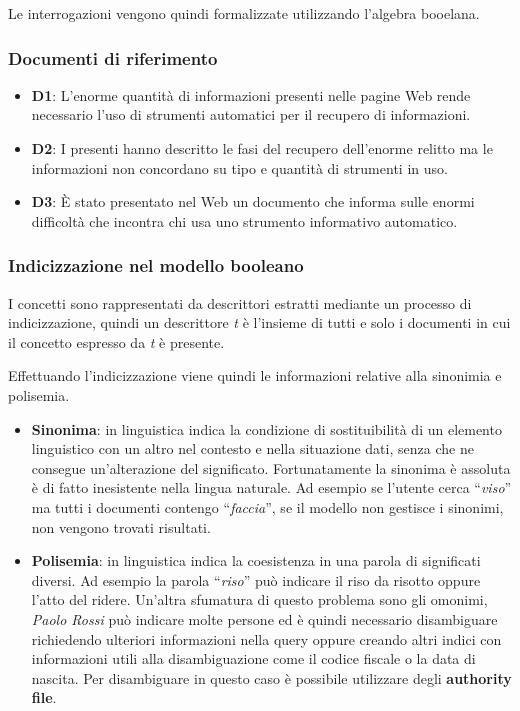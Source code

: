 Le interrogazioni vengono quindi formalizzate utilizzando l'algebra booelana.

\subsubsection{Documenti di riferimento}

\begin{itemize}
	\item \textbf{D1}: L’enorme quantità di informazioni presenti nelle pagine Web rende necessario l’uso di strumenti automatici per il recupero di informazioni.
	\item \textbf{D2}: I presenti hanno descritto le fasi del recupero dell'enorme relitto ma le informazioni non concordano su tipo e quantità di strumenti in uso.
	\item \textbf{D3}: \`E stato presentato nel Web un documento che informa sulle enormi difficoltà che incontra chi usa uno strumento informativo automatico.
\end{itemize}

\subsubsection{Indicizzazione nel modello booleano}

I concetti sono rappresentati da descrittori estratti mediante un processo di indicizzazione, quindi un descrittore \textit{t} è l'insieme di tutti e solo i documenti in cui il concetto espresso da \textit{t} è presente.

Effettuando l'indicizzazione viene quindi le informazioni relative alla sinonimia e polisemia.

\begin{itemize}
	\item \textbf{Sinonima}: in linguistica indica la condizione di sostituibilità di un elemento linguistico con un altro nel contesto e nella situazione dati, senza che ne consegue un'alterazione del significato. Fortunatamente la sinonima è assoluta è di fatto inesistente nella lingua naturale. Ad esempio se l'utente cerca ``\textit{viso}'' ma tutti i documenti contengo ``\textit{faccia}'', se il modello non gestisce i sinonimi, non vengono trovati risultati.
	\item \textbf{Polisemia}: in linguistica indica la coesistenza in una parola di significati diversi. Ad esempio la parola ``\textit{riso}'' può indicare il riso da risotto oppure l'atto del ridere. Un'altra sfumatura di questo problema sono gli omonimi, \textit{Paolo Rossi} può indicare molte persone ed è quindi necessario disambiguare richiedendo ulteriori informazioni nella query oppure creando altri indici con informazioni utili alla disambiguazione come il codice fiscale o la data di nascita. Per disambiguare in questo caso è possibile utilizzare degli \textbf{authority file}.
\end{itemize}

